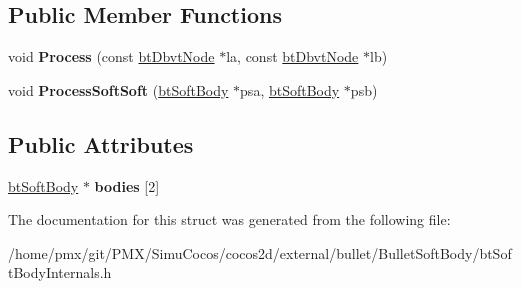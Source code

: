 \subsection*{Public Member Functions}
\begin{DoxyCompactItemize}
\item 
\mbox{\label{structbtSoftColliders_1_1CollideCL__SS_a1d8e929afd1afec1b606cce34c4a9a32}} 
void {\bfseries Process} (const \hyperlink{structbtDbvtNode}{bt\+Dbvt\+Node} $\ast$la, const \hyperlink{structbtDbvtNode}{bt\+Dbvt\+Node} $\ast$lb)
\item 
\mbox{\label{structbtSoftColliders_1_1CollideCL__SS_add30e370fb0aee3ccb58c4ef6758a5fc}} 
void {\bfseries Process\+Soft\+Soft} (\hyperlink{classbtSoftBody}{bt\+Soft\+Body} $\ast$psa, \hyperlink{classbtSoftBody}{bt\+Soft\+Body} $\ast$psb)
\end{DoxyCompactItemize}
\subsection*{Public Attributes}
\begin{DoxyCompactItemize}
\item 
\mbox{\label{structbtSoftColliders_1_1CollideCL__SS_a5f72549e519b6274255f78bf00b62dec}} 
\hyperlink{classbtSoftBody}{bt\+Soft\+Body} $\ast$ {\bfseries bodies} \mbox{[}2\mbox{]}
\end{DoxyCompactItemize}


The documentation for this struct was generated from the following file\+:\begin{DoxyCompactItemize}
\item 
/home/pmx/git/\+P\+M\+X/\+Simu\+Cocos/cocos2d/external/bullet/\+Bullet\+Soft\+Body/bt\+Soft\+Body\+Internals.\+h\end{DoxyCompactItemize}
